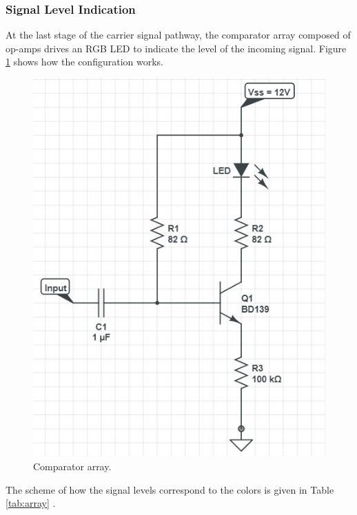 \documentclass[a4paper,10pt]{IEEEtran}
\begin{document}
\subsubsection{Signal Level Indication}
At the last stage of the carrier signal pathway, the comparator array composed of op-amps drives an RGB LED to indicate the level of the incoming signal. Figure \ref{array} shows how the configuration works.
\begin{figure}[htbp!]
    \centering
    \includegraphics[width = 1\linewidth]{Led Driver Circuit.jpg}
    \caption{Comparator array.}
    \label{array}
\end{figure}
The scheme of how the signal levels correspond to the colors is given in Table \ref{tab:array} .
\end{document}
